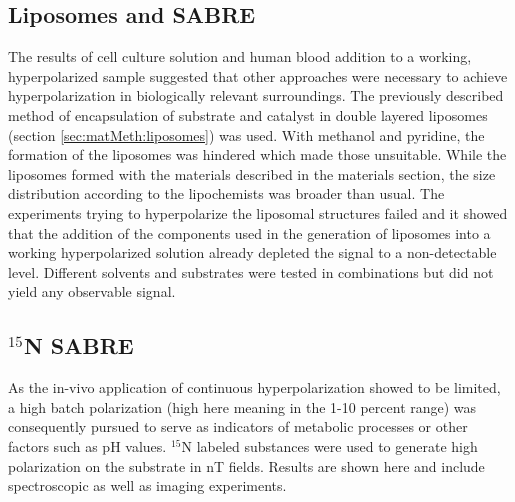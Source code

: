     \subsection{Liposomes and SABRE}
    \label{sec:results:liposomes}
    The results of cell culture solution and human blood addition to a working, hyperpolarized sample suggested that other approaches were necessary to achieve hyperpolarization in biologically relevant surroundings. The previously described method of encapsulation of substrate and catalyst in double layered liposomes (section \ref{sec:matMeth:liposomes}) was used. With methanol and pyridine, the formation of the liposomes was hindered which made those unsuitable. While the liposomes formed with the materials described in the materials section, the size distribution according to the lipochemists was broader than usual. The experiments trying to hyperpolarize the liposomal structures failed and it showed that the addition of the components used in the generation of liposomes into a working hyperpolarized solution already depleted the signal to a non-detectable level. Different solvents and substrates were tested in combinations but did not yield any observable signal.  
\subsection{$^{15}$N SABRE}
As the in-vivo application of continuous hyperpolarization showed to be limited, a high batch polarization (high here meaning in the 1-10 percent range) was consequently pursued to serve as indicators of metabolic processes or other factors such as pH values.
        $^{15}\mathrm{N}$ labeled substances were used to generate high polarization on the substrate in \si{\nano\tesla} fields. Results are shown here and include spectroscopic as well as imaging experiments.
